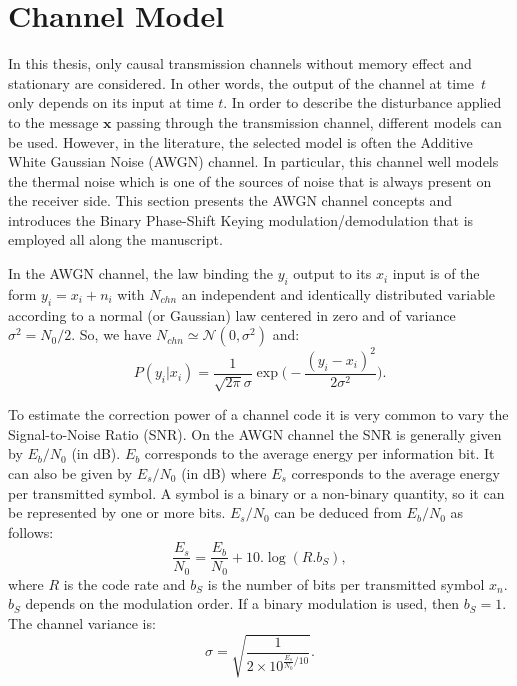 \section{Channel Model}
\label{sec:ctx_awgn}

In this thesis, only causal transmission channels without memory effect and
stationary are considered. In other words, the output of the channel at time~$t$
only depends on its input at time $t$. In order to describe the disturbance
applied to the message $\bm{x}$ passing through the transmission channel,
different models can be used. However, in the literature, the selected model is
often the Additive White Gaussian Noise (AWGN) channel. In particular, this
channel well models the thermal noise which is one of the sources of noise
that is always present on the receiver side. This section presents the AWGN
channel concepts and introduces the Binary Phase-Shift Keying
modulation/demodulation that is employed all along the manuscript.

In the AWGN channel, the law binding the $y_i$ output to its $x_i$ input is of
the form $y_i = x_i + n_i$ with $N_{chn}$ an independent and identically
distributed variable according to a normal (or Gaussian) law centered in zero
and of variance $\sigma^2 = N_0 / 2$. So, we have $N_{chn} \simeq \mathcal{N}(0,
\sigma^2)$ and:
\begin{equation}
P(y_i|x_i) = \frac{1}{\sqrt{2\pi}\sigma}\exp{\Big(-\frac{(y_i-x_i)^2}{2\sigma^2}\Big)}.
\end{equation}

To estimate the correction power of a channel code it is very common to vary the
Signal-to-Noise Ratio (SNR). On the AWGN channel the SNR is generally given by
$E_b/N_0$ (in dB). $E_b$ corresponds to the average energy per information bit.
It can also be given by $E_s/N_0$ (in dB) where $E_s$ corresponds to the average
energy per transmitted symbol. A symbol is a binary or a non-binary quantity, so
it can be represented by one or more bits. $E_s/N_0$ can be deduced from
$E_b/N_0$ as follows:
\begin{equation}
\frac{E_s}{N_0} = \frac{E_b}{N_0} + 10.\log{(R.b_S)},
\end{equation}
where $R$ is the code rate and $b_S$ is the number of bits per transmitted
symbol $x_n$. $b_S$ depends on the modulation order. If a binary modulation is
used, then $b_S = 1$. The channel variance is:
\begin{equation}
\sigma = \sqrt{\frac{1}{2 \times 10^{\frac{E_s}{N_0} / 10}}}.
\end{equation}

